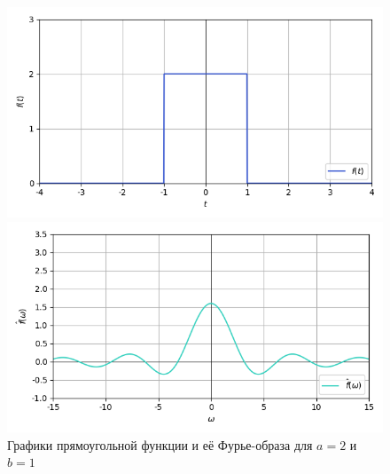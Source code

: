 \documentclass[a4paper]{article}
\begin{document}
\begin{figure}[H]
    \begin{minipage}{0.5\textwidth}
        \centering \includegraphics[width=\textwidth]{sources/1_rectangular/graph_2.png}
    \end{minipage}\hfill
    \begin{minipage}{0.5\textwidth}
        \centering \includegraphics[width=\textwidth]{sources/1_rectangular/fourier_2.png}
    \end{minipage}
    \caption{Графики прямоугольной функции и её Фурье-образа для $a = 2$ и $b = 1$} 
\end{figure}
\end{document}
